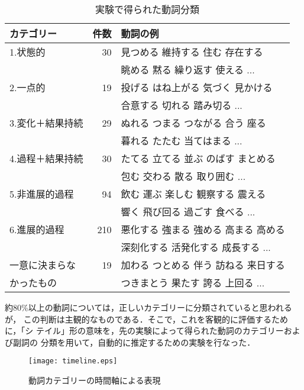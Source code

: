 \begin{table}[h]
\caption{実験で得られた動詞分類}
\label{tab:result}
\centering
\begin{tabular}{|l|r|l|}  \hline
カテゴリー       & 件数               & 動詞の例 \\ \hline\hline
1.状態的             &  30 & 見つめる 維持する 住む 存在する \\
                     &     & 眺める 黙る 繰り返す 使える ... \\ \hline
2.一点的             &  19 & 投げる はね上がる 気づく 見かける \\
                     &     & 合意する 切れる 踏み切る ... \\ \hline
3.変化＋結果持続     &  29 & ぬれる つまる つながる 合う 座る \\
                     &     &  暮れる たたむ 当てはまる ... \\ \hline
4.過程＋結果持続     &  30 & たてる 立てる 並ぶ のばす まとめる \\
                     &     & 包む 交わる 散る 取り囲む ... \\ \hline
5.非進展的過程       &  94 & 飲む 運ぶ 楽しむ 観察する 震える \\
                     &     & 響く 飛び回る 過ごす 食べる ...\\ \hline
6.進展的過程         & 210 & 悪化する 強まる 強める 高まる 高める \\
                     &     &  深刻化する 活発化する 成長する ...\\ \hline
一意に決まらな       &  19 &  加わる つとめる 伴う 訪ねる 来日する \\
かったもの           &     &  つきまとう 果たす 誇る 上回る ... \\ \hline
\end{tabular}
\end{table}

約80\%以上の動詞については，正しいカテゴリーに分類されていると思われるが，
この判断は主観的なものである．そこで，これを客観的に評価するために，「シ
テイル」形の意味を，先の実験によって得られた動詞のカテゴリーおよび副詞の
分類を用いて，自動的に推定するための実験を行なった．

\begin{figure}
\begin{center}
	\leavevmode
	
      	\texttt{[image: timeline.eps]}
	
\end{center}
\caption{動詞カテゴリーの時間軸による表現}
\label{fig:timeline}
\end{figure}

